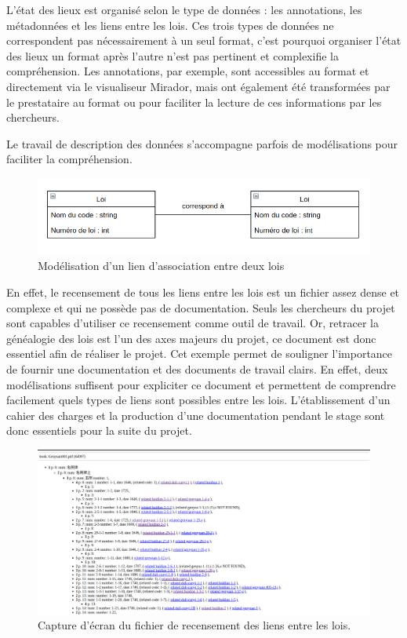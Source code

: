 L'état des lieux est organisé selon le type de données : les annotations, les métadonnées et les liens entre les lois. Ces trois types de données ne correspondent pas nécessairement à un seul format, c'est pourquoi organiser l'état des lieux un format après l'autre n'est pas pertinent et complexifie la compréhension. Les annotations, par exemple, sont accessibles au format \JSON et directement via le visualiseur Mirador, mais ont également été transformées par le prestataire au format \csv ou \tsv pour faciliter la lecture de ces informations par les chercheurs. 

Le travail de description des données s'accompagne parfois de modélisations \UML pour faciliter la compréhension.
\begin{figure}[h]
    \centering
    \includegraphics[width=\textwidth]{images/image4.png}
    \caption{Modélisation d'un lien d'association entre deux lois}
    \label{Modélisation d'un lien d'association entre les lois}
\end{figure}
En effet, le recensement de tous les liens entre les lois est un fichier assez dense et complexe et qui ne possède pas de documentation. Seuls les chercheurs du projet \EPJ sont capables d'utiliser ce recensement comme outil de travail. Or, retracer la généalogie des lois est l'un des axes majeurs du projet, ce document est donc essentiel afin de réaliser le projet. Cet exemple permet de souligner l'importance de fournir une documentation et des documents de travail clairs. En effet, deux modélisations suffisent pour expliciter ce document et permettent de comprendre facilement quels types de liens sont possibles entre les lois. L'établissement d'un cahier des charges et la production d'une documentation pendant le stage sont donc essentiels pour la suite du projet.  

\begin{figure}
    \centering
    \includegraphics[width=\textwidth]{images/image6.png}
    \caption{Capture d'écran du fichier de recensement des liens entre les lois.}
\end{figure}

